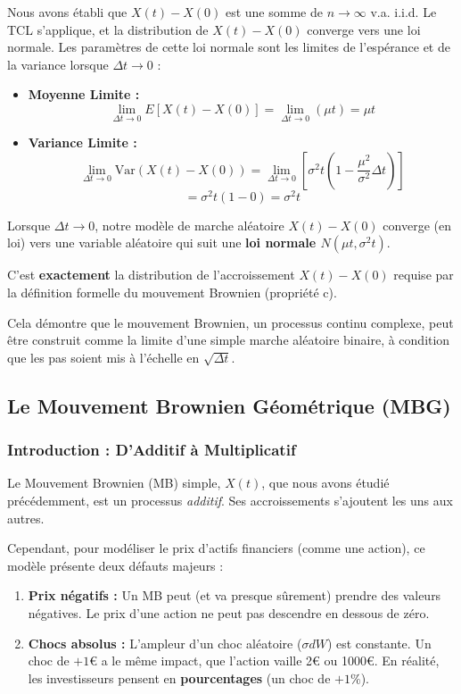 Nous avons établi que $X(t) - X(0)$ est une somme de $n \to \infty$ v.a. i.i.d. Le TCL s'applique, et la distribution de $X(t) - X(0)$ converge vers une loi normale.
Les paramètres de cette loi normale sont les limites de l'espérance et de la variance lorsque $\Delta t \to 0$ :

\begin{itemize}
    \item \textbf{Moyenne Limite :} 
    $$ \lim_{\Delta t \to 0} E[X(t) - X(0)] = \lim_{\Delta t \to 0} (\mu t) = \mu t $$
    
    \item \textbf{Variance Limite :} 
    $$ \lim_{\Delta t \to 0} \text{Var}(X(t) - X(0)) = \lim_{\Delta t \to 0} \left[ \sigma^2 t \left( 1 - \frac{\mu^2}{\sigma^2} \Delta t \right) \right] $$
    $$ = \sigma^2 t (1 - 0) = \sigma^2 t $$
\end{itemize}

\begin{intuitionbox}[Conclusion]
Lorsque $\Delta t \to 0$, notre modèle de marche aléatoire $X(t) - X(0)$ converge (en loi) vers une variable aléatoire qui suit une \textbf{loi normale $N(\mu t, \sigma^2 t)$}.

C'est \textbf{exactement} la distribution de l'accroissement $X(t) - X(0)$ requise par la définition formelle du mouvement Brownien (propriété c).

Cela démontre que le mouvement Brownien, un processus continu complexe, peut être construit comme la limite d'une simple marche aléatoire binaire, à condition que les pas soient mis à l'échelle en $\sqrt{\Delta t}$.
\end{intuitionbox}

\subsection{Le Mouvement Brownien Géométrique (MBG)}

\subsubsection{Introduction : D'Additif à Multiplicatif}

Le Mouvement Brownien (MB) simple, $X(t)$, que nous avons étudié précédemment, est un processus \textit{additif}. Ses accroissements s'ajoutent les uns aux autres.

Cependant, pour modéliser le prix d'actifs financiers (comme une action), ce modèle présente deux défauts majeurs :
\begin{enumerate}
    \item \textbf{Prix négatifs :} Un MB peut (et va presque sûrement) prendre des valeurs négatives. Le prix d'une action ne peut pas descendre en dessous de zéro.
    \item \textbf{Chocs absolus :} L'ampleur d'un choc aléatoire ($\sigma dW$) est constante. Un choc de $+1€$ a le même impact, que l'action vaille 2€ ou 1000€. En réalité, les investisseurs pensent en \textbf{pourcentages} (un choc de $+1\%$).
\end{enumerate}

